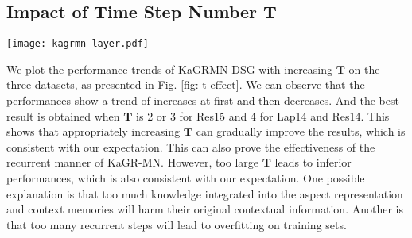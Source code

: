 \subsection{Impact of Time Step Number $\mathbf{T}$ }
\begin{figure*}[th]
 \centering
 \texttt{[image: kagrmn-layer.pdf]}
 \caption{Impact of the time step number $\mathbf{T}$}
 \label{fig: t-effect}
\end{figure*}
We plot the performance trends of KaGRMN-DSG with increasing $\mathbf{T}$ on the three datasets, as presented in Fig. \ref{fig: t-effect}.
We can observe that the performances show a trend of increases at first and then decreases.
And the best result is obtained when $\mathbf{T}$ is 2 or 3 for Res15 and 4 for Lap14 and Res14.
This shows that appropriately increasing $\mathbf{T}$ can gradually improve the results, which is consistent with our expectation.
This can also prove the effectiveness of the recurrent manner of KaGR-MN.
However, too large $\mathbf{T}$ leads to inferior performances, which is also consistent with our expectation. One possible explanation is that too much knowledge integrated into the aspect representation and context memories will harm their original contextual information.
Another is that too many recurrent steps will lead to overfitting on training sets.
